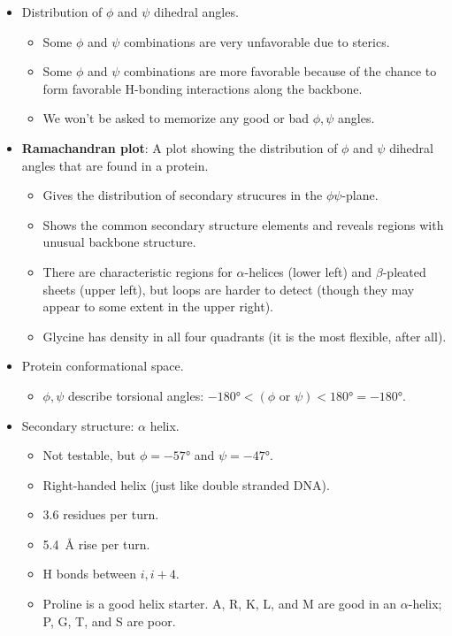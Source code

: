 \documentclass[../notes.tex]{subfiles}
\begin{document}
\begin{itemize}
    \item Distribution of $\phi$ and $\psi$ dihedral angles.
    \begin{itemize}
        \item Some $\phi$ and $\psi$ combinations are very unfavorable due to sterics.
        \item Some $\phi$ and $\psi$ combinations are more favorable because of the chance to form favorable H-bonding interactions along the backbone.
        \item We won't be asked to memorize any good or bad $\phi,\psi$ angles.
    \end{itemize}
    \item \textbf{Ramachandran plot}: A plot showing the distribution of $\phi$ and $\psi$ dihedral angles that are found in a protein.
    \begin{itemize}
        \item Gives the distribution of secondary strucures in the $\phi\psi$-plane.
        \item Shows the common secondary structure elements and reveals regions with unusual backbone structure.
        \item There are characteristic regions for $\alpha$-helices (lower left) and $\beta$-pleated sheets (upper left), but loops are harder to detect (though they may appear to some extent in the upper right).
        \item Glycine has density in all four quadrants (it is the most flexible, after all).
    \end{itemize}
    \item Protein conformational space.
    \begin{itemize}
        \item $\phi,\psi$ describe torsional angles: $-\ang{180}<(\phi\text{ or }\psi)<\ang{180}=-\ang{180}$.
    \end{itemize}
    \item Secondary structure: $\alpha$ helix.
    \begin{itemize}
        \item Not testable, but $\phi=\ang{-57}$ and $\psi=-\ang{47}$.
        \item Right-handed helix (just like double stranded DNA).
        \item 3.6 residues per turn.
        \item \SI{5.4}{\angstrom} rise per turn.
        \item H bonds between $i,i+4$.
        \item Proline is a good helix starter. A, R, K, L, and M are good in an $\alpha$-helix; P, G, T, and S are poor.

\end{itemize}
\end{itemize}
\end{document}
